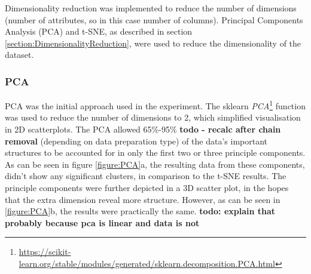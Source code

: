 
Dimensionality reduction was implemented to reduce the number of dimensions (number of attributes, so in this case number of columns). Principal Components Analysis (PCA) and t-SNE, as described in section \ref{section:DimensionalityReduction}, were used to reduce the dimensionality of the dataset. 

\subsubsection{PCA}
PCA was the initial approach used in the experiment. The sklearn \textit{PCA}\footnote{\url{https://scikit-learn.org/stable/modules/generated/sklearn.decomposition.PCA.html}} function was used to reduce the number of dimensions to 2, which simplified visualisation in 2D scatterplots. The PCA allowed 65\%-95\% \textbf{todo - recalc after chain removal} (depending on data preparation type) of the data's important structures to be accounted for in only the first two or three principle components. As can be seen in figure \ref{figure:PCA}a, the resulting data from these components, didn't show any significant clusters, in comparison to the t-SNE results. The principle components were further depicted in a 3D scatter plot, in the hopes that the extra dimension reveal more structure. However, as can be seen in \ref{figure:PCA}b, the results were practically the same. \textbf{todo: explain that probably because pca is linear and data is not}


